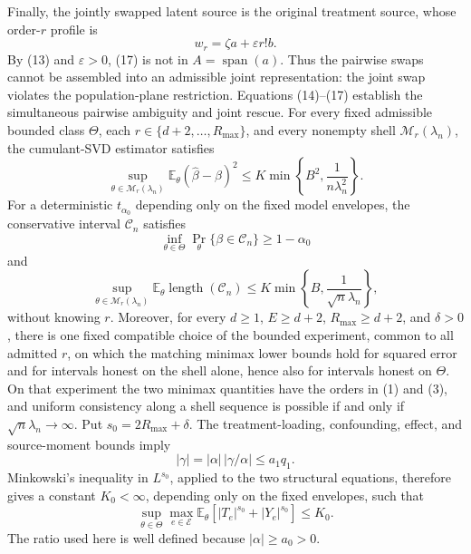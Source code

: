 Finally, the jointly swapped latent source is the original treatment source, whose order-\(r\) profile is
\[
 w_r=\zeta a+\varepsilon r!b.                                             \tag{17}
\]
By (13) and \(\varepsilon>0\), (17) is not in \(A=\operatorname{span}(a)\).  Thus the pairwise swaps cannot be assembled into an admissible joint representation: the joint swap violates the population-plane restriction.  Equations (14)--(17) establish the simultaneous pairwise ambiguity and joint rescue.
For every fixed admissible bounded class \(\Theta\), each \(r\in\{d+2,\ldots,R_{\max}\}\), and every nonempty shell \(\mathcal M_r(\lambda_n)\), the cumulant-SVD estimator satisfies
\[
 \sup_{\theta\in\mathcal M_r(\lambda_n)}
 \mathbb E_\theta(\widehat\beta-\beta)^2
 \leq K\min\left\{B^2,\frac1{n\lambda_n^2}\right\}.                    \tag{1}
\]
For a deterministic \(t_{\alpha_0}\) depending only on the fixed model envelopes, the conservative interval \(\mathcal C_n\) satisfies
\[
 \inf_{\theta\in\Theta}\Pr_\theta\{\beta\in\mathcal C_n\}
 \geq1-\alpha_0                                                         \tag{2}
\]
and
\[
 \sup_{\theta\in\mathcal M_r(\lambda_n)}
 \mathbb E_\theta\operatorname{length}(\mathcal C_n)
 \leq K\min\left\{B,\frac1{\sqrt n\lambda_n}\right\},                  \tag{3}
\]
without knowing \(r\).  Moreover, for every \(d\geq1\), \(E\geq d+2\), \(R_{\max}\geq d+2\), and \(\delta>0\), there is one fixed compatible choice of the bounded experiment, common to all admitted \(r\), on which the matching minimax lower bounds hold for squared error and for intervals honest on the shell alone, hence also for intervals honest on \(\Theta\).  On that experiment the two minimax quantities have the orders in (1) and (3), and uniform consistency along a shell sequence is possible if and only if \(\sqrt n\lambda_n\to\infty\).
Put \(s_0=2R_{\max}+\delta\).  The treatment-loading, confounding, effect, and source-moment bounds imply
\[
 |\gamma|=|\alpha|\,|\gamma/\alpha|\leq a_1q_1.
\]
Minkowski's inequality in \(L^{s_0}\), applied to the two structural equations, therefore gives a constant \(K_0<\infty\), depending only on the fixed envelopes, such that
\[
 \sup_{\theta\in\Theta}\max_{e\in\mathcal E}
 \mathbb E_\theta\left[|T_e|^{s_0}+|Y_e|^{s_0}\right]\leq K_0.           \tag{4}
\]
The ratio used here is well defined because \(|\alpha|\geq a_0>0\).

